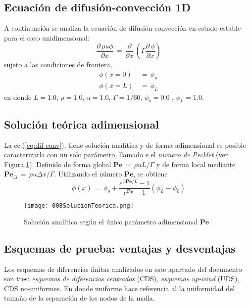 \documentclass[9pt,technote,twoside,letterpaper,onecolumn]{IEEEtran}
\begin{document}
\begin{multicols}{2}
\section{Ecuación de difusión-convección 1D}
\label{sec:dif-conv}
A continuación se analiza la ecuación de difusión-convección en estado estable para el caso unidimensional:
\begin{equation}
  \frac{\partial\,\rho u \phi}{\partial x}\,=\,\frac{\partial}{\partial x}\,\left(\Gamma\frac{\partial\,\phi}{\partial x}\right)
  \label{eq:dif-conv}
\end{equation}
sujeto a las condiciones de frontera,
\begin{align}
  \phi(x=0)\,&=\,\phi_o\\
  \phi(x=L)\,&=\,\phi_L
\end{align}
en donde $L=1.0$, $\rho=1.0$, $u=1.0$, $\Gamma=1/60$, $\phi_o=0.0$ , $\phi_L=1.0$. 

\subsection{Solución teórica adimensional}
\label{sec:solteo}
La ec.(\ref{eq:dif-conv}), tiene solución analítica y de forma adimensional es posible caracterizarla con un solo parámetro, llamado e el \emph{numero de Pecklet} (ver Figura.\ref{fig:solteo}). Definido de forma global $\mathbf{Pe}\,=\,\rho uL/\Gamma$ y de forma local mediante $\mathbf{Pe}_\Delta\,=\,\rho u\Delta x/\Gamma$. Utilizando el número $\mathbf{Pe}$, se obtiene
\begin{equation}
  \phi(x)\,=\,\phi_o+\frac{e^{x\mathbf{Pe}/L}-1}{e^{\mathbf{Pe}}-1}(\phi_L-\phi_0)
  \label{eq:solteo}
\end{equation}

\begin{figure}[H]
  \centering
  \texttt{[image: 008SolucionTeorica.png]}\\
  \label{fig:solteo}
  \caption{Solución analítica según el único parámetro adimensional $\mathbf{Pe}$}
\end{figure}

\subsection{Esquemas de prueba: ventajas y desventajas}
\label{sec:esquemas}
Los esquemas de diferencias finitas analizados en este apartado del documento son tres: \emph{esquemas de diferencias centrados} (CDS), \emph{esquemas up-wind} (UDS), CDS no-uniformes. En donde uniforme hace referencia al la uniformidad del tamaño de la separación de los nodos de la malla.


\end{multicols}
\end{document}
